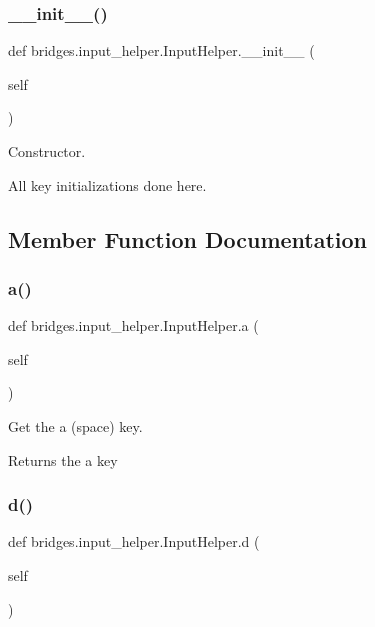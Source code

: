 \subsubsection{\texorpdfstring{\+\_\+\+\_\+init\+\_\+\+\_\+()}{\_\_init\_\_()}}
{\footnotesize\ttfamily def bridges.\+input\+\_\+helper.\+Input\+Helper.\+\_\+\+\_\+init\+\_\+\+\_\+ (\begin{DoxyParamCaption}\item[{}]{self }\end{DoxyParamCaption})}



Constructor. 

All key initializations done here. 

\subsection{Member Function Documentation}
\mbox{\label{classbridges_1_1input__helper_1_1_input_helper_ab46a28fb36f78208840e1bc49f523d71}} 
\subsubsection{\texorpdfstring{a()}{a()}}
{\footnotesize\ttfamily def bridges.\+input\+\_\+helper.\+Input\+Helper.\+a (\begin{DoxyParamCaption}\item[{}]{self }\end{DoxyParamCaption})}



Get the \textquotesingle{}a\textquotesingle{} (space) key. 

\begin{DoxyReturn}{Returns}
the \textquotesingle{}a\textquotesingle{} key 
\end{DoxyReturn}
\mbox{\label{classbridges_1_1input__helper_1_1_input_helper_a1eade5f8acf2f1c85671c90cdfcaf57e}} 
\subsubsection{\texorpdfstring{d()}{d()}}
{\footnotesize\ttfamily def bridges.\+input\+\_\+helper.\+Input\+Helper.\+d (\begin{DoxyParamCaption}\item[{}]{self }\end{DoxyParamCaption})}



